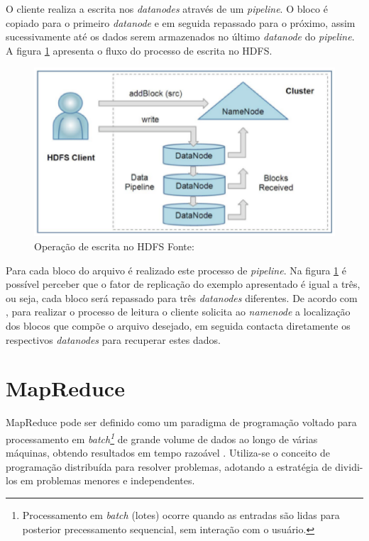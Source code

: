 O cliente realiza a escrita nos \textit{datanodes} através de um \textit{pipeline}. O bloco é copiado para o primeiro \textit{datanode} e em seguida repassado para o próximo, assim sucessivamente até os dados serem armazenados no último \textit{datanode} do \textit{pipeline}. A figura \ref{fig-hdfs-escrita} apresenta o fluxo do processo de escrita no HDFS.

\begin{figure}[ht!]
	\centering
	\includegraphics[keepaspectratio=true,scale=0.5]
	  {figuras/hdfs-escrita.eps}
	\caption[Operação de escrita no HDFS]{Operação de escrita no HDFS
	\protect\linebreak Fonte: \cite{shvachko2010}}
	\label{fig-hdfs-escrita}
\end{figure}
\FloatBarrier

Para cada bloco do arquivo é realizado este processo de \textit{pipeline}. Na figura \ref{fig-hdfs-escrita} é possível perceber que o fator de replicação do exemplo apresentado é igual a três, ou seja, cada bloco será repassado para três \textit{datanodes} diferentes. De acordo com , para realizar o processo de leitura o cliente solicita ao \textit{namenode} a localização dos blocos que compõe o arquivo desejado, em seguida contacta diretamente os respectivos \textit{datanodes} para recuperar estes dados.

\section{MapReduce}

MapReduce pode ser definido como um paradigma de programação voltado para processamento em \textit{batch\footnote{Processamento em \textit{batch} (lotes) ocorre quando as entradas são lidas para posterior precessamento sequencial, sem interação com o usuário.}} de grande volume de dados ao longo de várias máquinas, obtendo resultados em tempo razoável \cite{white2012}. Utiliza-se o conceito de programação distribuída para resolver problemas, adotando a estratégia de dividi-los em problemas menores e independentes.

